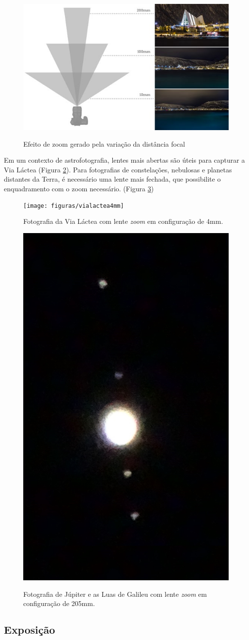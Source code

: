 \begin{figure}[htb]
	\centering
	\caption{Efeito de zoom gerado pela variação da distância focal}
	\includegraphics[width=0.7\linewidth]{figuras/claudia-distanciafocal}
	\label{fig:focaldistance}
\end{figure}

Em um contexto de astrofotografia, lentes mais abertas são úteis para capturar a Via Láctea (Figura \ref{fig:vialactea4mmSony}). Para fotografias de constelações, nebulosas e planetas distantes da Terra, é necessário uma lente mais fechada, que possibilite o enquadramento com o zoom necessário. (Figura \ref{fig:jupiterSony})

\begin{figure}[!htb]
	\centering
	\caption{Fotografia da Via Láctea com lente \textit{zoom} em configuração de 4mm.}
	\texttt{[image: figuras/vialactea4mm]}
	\label{fig:vialactea4mmSony}
\end{figure}

\begin{figure}[!htb]
	\centering
	\caption{Fotografia de Júpiter e as Luas de Galileu com lente \textit{zoom} em configuração de 205mm.}
	\includegraphics[width=0.2\linewidth]{figuras/jupiter205mm_Luas}
	\label{fig:jupiterSony}
\end{figure}

\subsection{Exposição}

